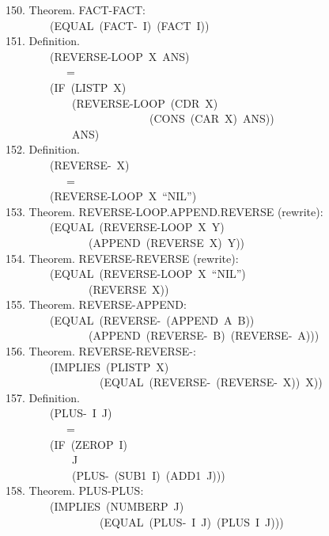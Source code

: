 \documentclass[10pt]{book}
\newenvironment{pubasis}{\begin{flushleft}}{\end{flushleft}}
\begin{document}
\begin{pubasis}
150.    Theorem.  FACT-FACT:\\
~~~~~~~~(EQUAL~(FACT-~I)~(FACT~I))\\

151.    Definition.\\
~~~~~~~~(REVERSE-LOOP~X~ANS)\\
~~~~~~~~~~~=\\
~~~~~~~~(IF~(LISTP~X)\\
~~~~~~~~~~~~(REVERSE-LOOP~(CDR~X)\\
~~~~~~~~~~~~~~~~~~~~~~~~~~(CONS~(CAR~X)~ANS))\\
~~~~~~~~~~~~ANS)\\

152.    Definition.\\
~~~~~~~~(REVERSE-~X)\\
~~~~~~~~~~~=\\
~~~~~~~~(REVERSE-LOOP~X~``NIL'')\\

153.    Theorem.  REVERSE-LOOP.APPEND.REVERSE (rewrite):\\
~~~~~~~~(EQUAL~(REVERSE-LOOP~X~Y)\\
~~~~~~~~~~~~~~~(APPEND~(REVERSE~X)~Y))\\

154.    Theorem.  REVERSE-REVERSE (rewrite):\\
~~~~~~~~(EQUAL~(REVERSE-LOOP~X~``NIL'')\\
~~~~~~~~~~~~~~~(REVERSE~X))\\

155.    Theorem.  REVERSE-APPEND:\\
~~~~~~~~(EQUAL~(REVERSE-~(APPEND~A~B))\\
~~~~~~~~~~~~~~~(APPEND~(REVERSE-~B)~(REVERSE-~A)))\\

156.    Theorem.  REVERSE-REVERSE-:\\
~~~~~~~~(IMPLIES~(PLISTP~X)\\
~~~~~~~~~~~~~~~~~(EQUAL~(REVERSE-~(REVERSE-~X))~X))\\

157.    Definition.\\
~~~~~~~~(PLUS-~I~J)\\
~~~~~~~~~~~=\\
~~~~~~~~(IF~(ZEROP~I)\\
~~~~~~~~~~~~J\\
~~~~~~~~~~~~(PLUS-~(SUB1~I)~(ADD1~J)))\\

158.    Theorem.  PLUS-PLUS:\\
~~~~~~~~(IMPLIES~(NUMBERP~J)\\
~~~~~~~~~~~~~~~~~(EQUAL~(PLUS-~I~J)~(PLUS~I~J)))\\


\end{pubasis}
\end{document}
